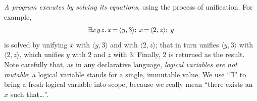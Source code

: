 \documentclass[acmsmall]{acmart}
\newcommand{\Varid}[1]{\mathit{#1}}
\begin{document}
\emph{A program executes by solving its equations}, using the process of unification.
For example,
$$
\ensuremath{\exists\Varid{x}\hspace{0.1em}\Varid{y}\hspace{0.1em}\Varid{z}.\,\Varid{x}\hspace{-0.14em}=\hspace{-0.14em}\langle{}\Varid{y},\mathrm{3}\rangle;\,\Varid{x}\hspace{-0.14em}=\hspace{-0.14em}\langle{}\mathrm{2},\Varid{z}\rangle;\,\Varid{y}}
$$
is solved by unifying \ensuremath{\Varid{x}} with \ensuremath{\langle{}\Varid{y},\mathrm{3}\rangle} and with \ensuremath{\langle{}\mathrm{2},\Varid{z}\rangle}; that in turn unifies \ensuremath{\langle{}\Varid{y},\mathrm{3}\rangle} with \ensuremath{\langle{}\mathrm{2},\Varid{z}\rangle}, which
unifies \ensuremath{\Varid{y}} with \ensuremath{\mathrm{2}} and \ensuremath{\Varid{z}} with \ensuremath{\mathrm{3}}.  Finally, \ensuremath{\mathrm{2}} is returned as the result.
Note carefully that, as in any declarative language,
\emph{logical variables are not mutable}; a logical variable stands for a single, immutable value.
We use ``\ensuremath{\exists{}}'' to bring a fresh logical variable into scope, because we really
mean ``there exists an \ensuremath{\Varid{x}} such that\ldots''.
\end{document}
